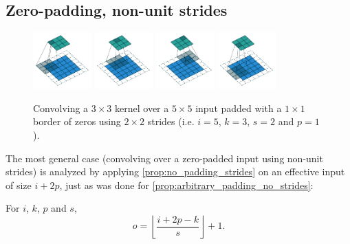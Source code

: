 \documentclass{article}
\begin{document}
\subsection{Zero-padding, non-unit strides}

\begin{figure}[h]
    \centering
    \includegraphics[width=0.2\textwidth]{pdf/padding_strides_00.pdf}
    \includegraphics[width=0.2\textwidth]{pdf/padding_strides_01.pdf}
    \includegraphics[width=0.2\textwidth]{pdf/padding_strides_02.pdf}
    \includegraphics[width=0.2\textwidth]{pdf/padding_strides_03.pdf}
    \caption{\label{fig:padding_strides} Convolving a $3 \times 3$ kernel over a
        $5 \times 5$ input padded with a $1 \times 1$ border of zeros using $2
        \times 2$ strides (i.e.  $i = 5$, $k = 3$, $s = 2$ and $p = 1$).}
\end{figure}

The most general case (convolving over a zero-padded input using non-unit
strides) is analyzed by applying \autoref{prop:no_padding_strides} on an
effective input of size $i + 2p$, just as was done for
\autoref{prop:arbitrary_padding_no_strides}:

\begin{prop}\label{prop:padding_strides}
For $i$, $k$, $p$ and $s$,
\begin{equation*}
    o = \left\lfloor \frac{i + 2p - k}{s} \right\rfloor + 1.
\end{equation*}
\end{prop}
\end{document}
